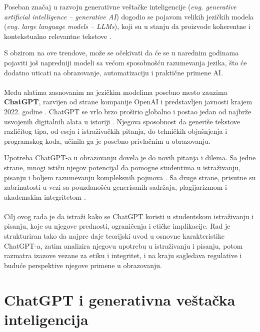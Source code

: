 \documentclass[12pt]{article}
\begin{document}
Poseban značaj u razvoju generativne veštačke inteligencije (\textit{eng. generative artificial intelligence – generative AI}) dogodio se pojavom velikih jezičkih modela (\textit{eng. large language models – LLMs}), koji su u stanju da proizvode koherentne i kontekstualno relevantne tekstove \cite{montenegro2023impact}.

S obzirom na ove trendove, može se očekivati da će se u narednim godinama pojaviti još napredniji modeli sa većom sposobnošću razumevanja jezika, što će dodatno uticati na obrazovanje, automatizaciju i praktične primene AI.


\paragraph{} 
Među alatima zasnovanim na jezičkim modelima posebno mesto zauzima \textbf{ChatGPT}, razvijen od strane kompanije OpenAI i predstavljen javnosti krajem 2022. godine \cite{openai2022chatgpt}. ChatGPT se vrlo brzo proširio globalno i postao jedan od najbrže usvojenih digitalnih alata u istoriji \cite{xu2025patterns}. Njegova sposobnost da generiše tekstove različitog tipa, od eseja i istraživačkih pitanja, do tehničkih objašnjenja i programskog koda, učinila ga je posebno privlačnim u obrazovanju.

Upotreba ChatGPT-a u obrazovanju dovela je do novih pitanja i dilema. Sa jedne strane, mnogi ističu njegov potencijal da pomogne studentima u istraživanju, pisanju i boljem razumevanju kompleksnih pojmova \cite{alsaedi2024chatgpt}. Sa druge strane, prisutne su zabrinutosti u vezi sa pouzdanošću generisanih sadržaja, plagijarizmom i akademskim integritetom \cite{oliveira2025humanai}.

\paragraph{}
Cilj ovog rada je da istraži kako se ChatGPT koristi u studentskom istraživanju i pisanju, koje su njegove prednosti, ograničenja i etičke implikacije. Rad je strukturiran tako da najpre daje teorijski uvod u osnovne karakteristike ChatGPT-a, zatim analizira njegovu upotrebu u istraživanju i pisanju, potom razmatra izazove vezane za etiku i integritet, i na kraju sagledava regulative i buduće perspektive njegove primene u obrazovanju.

\section{ChatGPT i generativna veštačka inteligencija}
\end{document}
